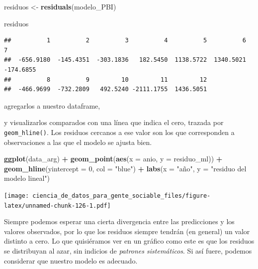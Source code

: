 \documentclass[spanish,]{book}
\newenvironment{Shaded}{\begin{snugshade}}{\end{snugshade}}
\newcommand{\DataTypeTok}[1]{\textcolor[rgb]{0.13,0.29,0.53}{#1}}
\newcommand{\DecValTok}[1]{\textcolor[rgb]{0.00,0.00,0.81}{#1}}
\newcommand{\KeywordTok}[1]{\textcolor[rgb]{0.13,0.29,0.53}{\textbf{#1}}}
\newcommand{\NormalTok}[1]{#1}
\newcommand{\OperatorTok}[1]{\textcolor[rgb]{0.81,0.36,0.00}{\textbf{#1}}}
\newcommand{\StringTok}[1]{\textcolor[rgb]{0.31,0.60,0.02}{#1}}
\begin{document}
\begin{Shaded}
\begin{Highlighting}[]
\NormalTok{residuos <-}\StringTok{ }\KeywordTok{residuals}\NormalTok{(modelo_PBI)}

\NormalTok{residuos}
\end{Highlighting}
\end{Shaded}

\begin{verbatim}
##          1          2          3          4          5          6          7 
##  -656.9180  -145.4351  -303.1836   182.5450  1138.5722  1340.5021  -174.6855 
##          8          9         10         11         12 
##  -466.9699  -732.2809   492.5240 -2111.1755  1436.5051
\end{verbatim}

agregarlos a nuestro dataframe,

\begin{Shaded}
\end{Shaded}

y visualizarlos comparados con una línea que indica el cero, trazada por \texttt{geom\_hline()}. Los residuos cercanos a ese valor son los que corresponden a observaciones a las que el modelo se ajusta bien.

\begin{Shaded}
\begin{Highlighting}[]
\KeywordTok{ggplot}\NormalTok{(data_arg) }\OperatorTok{+}
\StringTok{    }\KeywordTok{geom_point}\NormalTok{(}\KeywordTok{aes}\NormalTok{(}\DataTypeTok{x =}\NormalTok{ anio, }\DataTypeTok{y =}\NormalTok{ residuo_ml)) }\OperatorTok{+}
\StringTok{    }\KeywordTok{geom_hline}\NormalTok{(}\DataTypeTok{yintercept =} \DecValTok{0}\NormalTok{, }\DataTypeTok{col =} \StringTok{"blue"}\NormalTok{) }\OperatorTok{+}
\StringTok{    }\KeywordTok{labs}\NormalTok{(}\DataTypeTok{x =} \StringTok{"año"}\NormalTok{, }\DataTypeTok{y =} \StringTok{"residuo del modelo lineal"}\NormalTok{)}
\end{Highlighting}
\end{Shaded}

\texttt{[image: ciencia\_de\_datos\_para\_gente\_sociable\_files/figure-latex/unnamed-chunk-126-1.pdf]}

Siempre podemos esperar una cierta divergencia entre las predicciones y los valores observados, por lo que los residuos siempre tendrán (en general) un valor distinto a cero. Lo que quisiéramos ver en un gráfico como este es que los residuos se distribuyan al azar, sin indicios de \emph{patrones sistemáticos}. Si así fuere, podemos considerar que nuestro modelo es adecuado.
\end{document}
